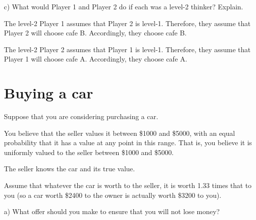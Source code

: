 \documentclass[
  letterpaper,
  DIV=11,
  numbers=noendperiod]{scrreprt}
\begin{document}
c) What would Player 1 and Player 2 do if each was a level-2 thinker?
Explain.

\begin{tcolorbox}[enhanced jigsaw, title=\textcolor{quarto-callout-tip-color}{\faLightbulb}\hspace{0.5em}{Answer}, toprule=.15mm, colback=white, breakable, titlerule=0mm, colframe=quarto-callout-tip-color-frame, coltitle=black, opacityback=0, rightrule=.15mm, colbacktitle=quarto-callout-tip-color!10!white, bottomtitle=1mm, opacitybacktitle=0.6, arc=.35mm, bottomrule=.15mm, toptitle=1mm, leftrule=.75mm, left=2mm]

The level-2 Player 1 assumes that Player 2 is level-1. Therefore, they
assume that Player 2 will choose cafe B. Accordingly, they choose cafe
B.

The level-2 Player 2 assumes that Player 1 is level-1. Therefore, they
assume that Player 1 will choose cafe A. Accordingly, they choose cafe
A.

\end{tcolorbox}

\hypertarget{buying-a-car-1}{%
\section{Buying a car}\label{buying-a-car-1}}

Suppose that you are considering purchasing a car.

You believe that the seller values it between \$1000 and \$5000, with an
equal probability that it has a value at any point in this range. That
is, you believe it is uniformly valued to the seller between \$1000 and
\$5000.

The seller knows the car and its true value.

Assume that whatever the car is worth to the seller, it is worth 1.33
times that to you (so a car worth \$2400 to the owner is actually worth
\$3200 to you).

a) What offer should you make to ensure that you will not lose money?
\end{document}
